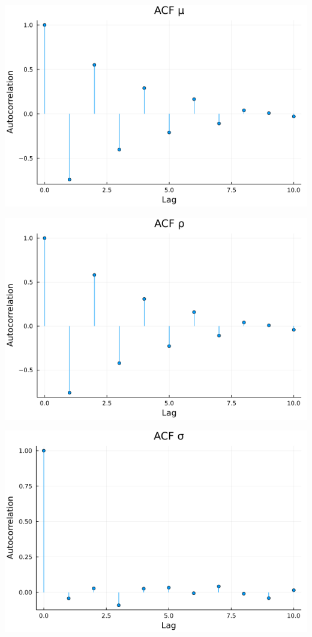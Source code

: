 \documentclass{article}
\begin{document}
\begin{enumerate}
\begin{center}
\includegraphics[scale=0.5]{p2_q3_mu_acf.png}

\includegraphics[scale=0.5]{p2_q3_rho_acf.png}

\includegraphics[scale=0.5]{p2_q3_sigma_acf.png}


\end{center}
\end{enumerate}
\end{document}
